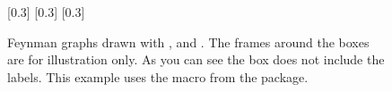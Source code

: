 %       
%         
\begin{figure}[htbp]
  \centering
    [0.3\textwidth]{
  }
  \subcaptionbox{\TikZ\label{fig:feyn:tikz}}
    [0.3\textwidth]{\fbox{%
    }
  }
    [0.3\textwidth]{}
  \caption{Feynman graphs drawn with , \Package{\TikZ} and .
    The frames around the boxes are for illustration only.
    As you can see the  box does not include the labels.
    This example uses the  macro from the  package.}%
  \label{fig:feyn:cf}
\end{figure}


